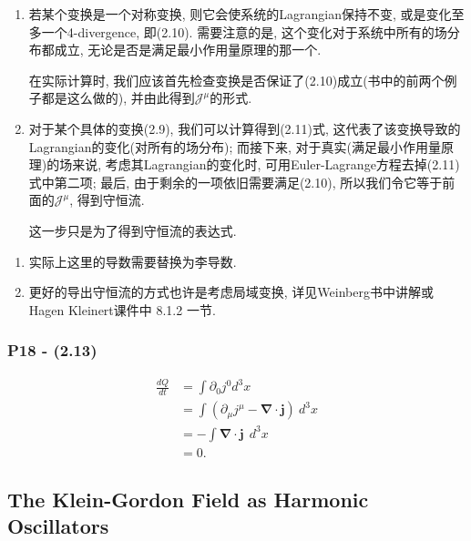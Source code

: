 \documentclass[cn,hazy,green,11pt,device=normal,chinesefont=founder]{elegantnote}
\begin{document}
\begin{enumerate}
  \item 若某个变换是一个对称变换, 则它会使系统的Lagrangian保持不变, 或是变化至多一个4-divergence, 即(2.10). 需要注意的是, 这个变化对于系统中所有的场分布都成立, 无论是否是满足最小作用量原理的那一个. 
  \begin{remark}
    在实际计算时, 我们应该首先检查变换是否保证了(2.10)成立(书中的前两个例子都是这么做的), 并由此得到$\mathcal{J}^{\mu}$的形式. 
  \end{remark}
  \item 对于某个具体的变换(2.9), 我们可以计算得到(2.11)式, 这代表了该变换导致的Lagrangian的变化(对所有的场分布); 而接下来, 对于真实(满足最小作用量原理)的场来说, 考虑其Lagrangian的变化时, 可用Euler-Lagrange方程去掉(2.11)式中第二项; 最后, 由于剩余的一项依旧需要满足(2.10), 所以我们令它等于前面的$\mathcal{J}^{\mu}$, 得到守恒流. 
  \begin{remark}
    这一步只是为了得到守恒流的表达式. 
  \end{remark}
\end{enumerate}

\begin{note}
  \mbox{}
  \begin{enumerate}
    \item 实际上这里的导数需要替换为李导数. 
    \item 更好的导出守恒流的方式也许是考虑局域变换, 详见Weinberg书中讲解或Hagen Kleinert课件中 8.1.2 一节. 
  \end{enumerate}
\end{note}

\subsubsection{P18 - (2.13)}
\begin{equation}
  \begin{aligned}
  \frac{dQ}{dt} &= \int \partial_0 j^0 d^3 x \\
  &= \int (\partial_\mu j^\mu - \boldsymbol{\nabla}\cdot\mathbf{j}) \ d^3 x \\
  & = - \int \boldsymbol{\nabla}\cdot\mathbf{j}\ \ d^3 x \\
  &=0.
  \end{aligned}
\end{equation}

\subsection{The Klein-Gordon Field as Harmonic Oscillators} 
\end{document}
